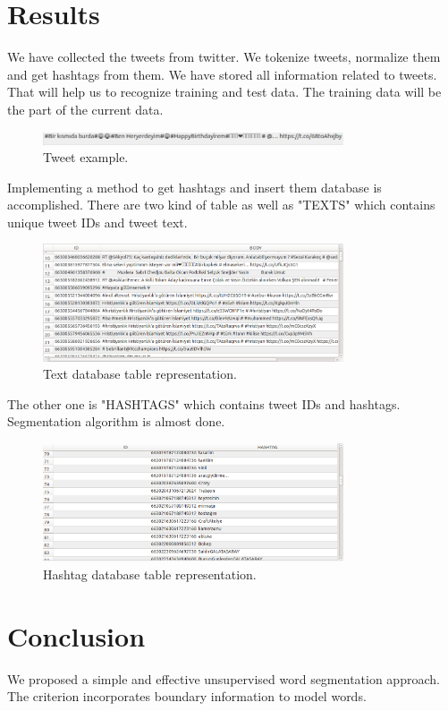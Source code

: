 \documentclass[12pt]{comjnl}
\begin{document}
\section{Results}
We have collected the tweets from twitter. We tokenize tweets, normalize them and get 
hashtags from them. We have stored all information related to tweets. That will help us to recognize training and test data. The training data will be the part of the current data.

\begin{figure}
\centering
\includegraphics[width=3.5in]{tweet.png}
\caption{Tweet example.}\label{fig:Tweet}
\end{figure}

Implementing a method to get hashtags and insert them database is 
accomplished. There are two kind of table as well as "TEXTS" which contains unique tweet IDs
and tweet text.

\begin{figure}
\centering
\includegraphics[width=3.5in]{text.png}
\caption{Text database table representation.}\label{fig:Tweet}
\end{figure}

The other one is "HASHTAGS" which contains tweet IDs and hashtags. Segmentation algorithm
is almost done.

\begin{figure}
\centering
\includegraphics[width=3.5in]{hashtag.png}
\caption{Hashtag database table representation.}\label{fig:Hashtag}
\end{figure}

\section{Conclusion}
We proposed a simple and effective unsupervised
word segmentation approach. The criterion incorporates
boundary information to model words.
\end{document}
